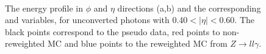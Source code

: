 \begin{figure}[ht]
    \centering
	 \\
    \caption{The energy profile in $\phi$ and $\eta$ directions (a,b) and the corresponding \Rphi and \Reta variables, for unconverted photons with 0.40$<|\eta|<$0.60. The black points correspond to the pseudo data, red points to non-reweighted MC and blue points to the reweighted MC from $Z\rightarrow ll\gamma$.}
    \label{fig:gamma:ss:reweighting:photon:closure}
\end{figure}
